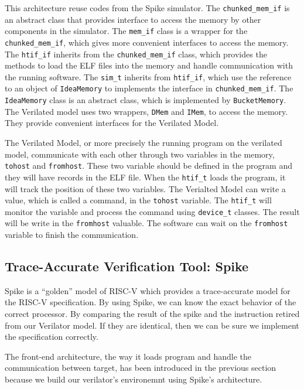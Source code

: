 This architecture reuse codes from the Spike simulator. The \texttt{chunked\_mem\_if} is an abstract class that provides interface to access the memory by other components in the simulator. The \texttt{mem\_if} class is a wrapper for the \texttt{chunked\_mem\_if}, which gives more convenient interfaces to access the memory. The \texttt{htif\_if} inherits from the \texttt{chunked\_mem\_if} class, which provides the methods to load the ELF files into the memory and handle communication with the running software. The \texttt{sim\_t} inherits from \texttt{htif\_if}, which use the reference to an object of \texttt{IdeaMemory} to implements the interface in \texttt{chunked\_mem\_if}. The \texttt{IdeaMemory} class is an abstract class, which is implemented by \texttt{BucketMemory}. The Verilated model uses two wrappers, \texttt{DMem} and \texttt{IMem}, to access the memory. They provide convenient interfaces for the Verilated Model. 

The Verilated Model, or more precisely the running program on the verilated model, communicate with each other through two variables in the memory, \texttt{tohost} and \texttt{fromhost}. These two variable should be defined in the program and they will have records in the ELF file. When the \texttt{htif\_t} loads the program, it will track the position of these two variables. The Verialted Model can write a value, which is called a command, in the \texttt{tohost} variable. The \texttt{htif\_t} will monitor the variable and process the command using \texttt{device\_t} classes. The result will be write in the \texttt{fromhost} valuable. The software can wait on the \texttt{fromhost} variable to finish the communication.

\subsection{Trace-Accurate Verification Tool: Spike} %

Spike is a ``golden'' model of RISC-V which provides a trace-accurate model for the RISC-V specification. By using Spike, we can know the exact behavior of the correct processor. By comparing the result of the spike and the instruction retired from our Verilator model. If they are identical, then we can be sure we implement the specification correctly.

The front-end architecture, the way it loads program and handle the communication between target, has been introduced in the previous section because we build our verilator's environemnt using Spike's architecture.

